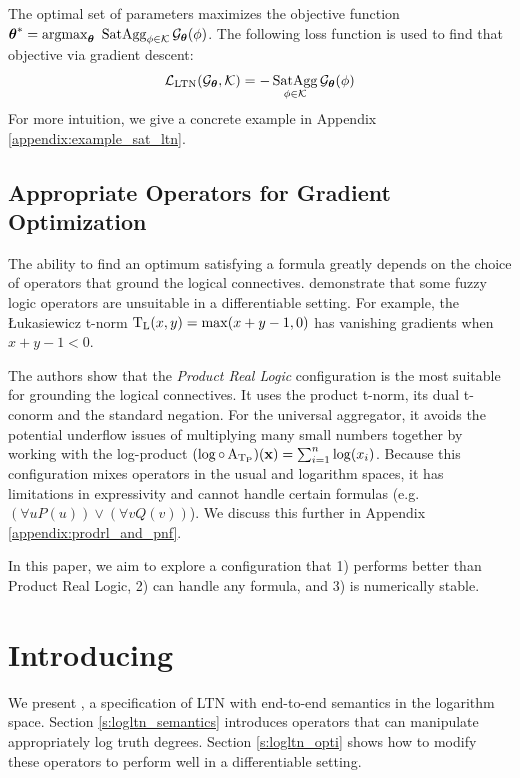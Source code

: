\documentclass{article}
\theoremstyle{definition}
\begin{document}
The optimal set of parameters maximizes the objective function $  \btheta^\ast = \argmax_{\btheta}\ \Sat_{\phi\in\K}\Gt(\phi)$.
The following loss function is used to find that objective via gradient descent:
\begin{equation}
    \mathcal{L}_{\textrm{LTN}}(\mathcal{G}_{\boldsymbol{\theta}}, \mathcal{K}) = - \operatorname*{SatAgg}_{\phi \in \mathcal{K}} \mathcal{G}_{\boldsymbol{\theta}}(\phi)
\end{equation}
For more intuition, we give a concrete example in Appendix \ref{appendix:example_sat_ltn}.

\subsection{Appropriate Operators for Gradient Optimization}
\label{s:gradients}
The ability to find an optimum satisfying a formula greatly depends on the choice of operators that ground the logical connectives.
\cite{van_krieken_analyzing_2022} demonstrate that some fuzzy logic operators are unsuitable in a differentiable setting.
For example, the \L{}ukasiewicz t-norm $\operatorname{T_{L}}(x,y) = \max(x+y-1,0)$ has vanishing gradients when $x+y-1<0$.

The authors show that the \emph{Product Real Logic} configuration is the most suitable for grounding the logical connectives.
It uses the product t-norm, its dual t-conorm and the standard negation.
For the universal aggregator, it avoids the potential underflow issues of multiplying many small numbers together by working with the log-product $(\log \circ \operatorname{A_{\operatorname{T_{P}}}})(\mathbf{x}) = \sum_{i=1}^{n} \log(x_i)$.
Because this configuration mixes operators in the usual and logarithm spaces, it has limitations in expressivity and cannot handle certain formulas (e.g. $(\forall u P(u)) \lor (\forall v Q(v))$).
We discuss this further in Appendix \ref{appendix:prodrl_and_pnf}.

In this paper, we aim to explore a configuration that  
1) performs better than Product Real Logic, 
2) can handle any formula,
and 3) is numerically stable.

\section{Introducing \logLTN}
\label{s:logltn}
We present \logLTN, a specification of LTN with end-to-end semantics in the logarithm space.
Section \ref{s:logltn_semantics} introduces operators that can manipulate appropriately log truth degrees.
Section \ref{s:logltn_opti} shows how to modify these operators to perform well in a differentiable setting.
\end{document}
